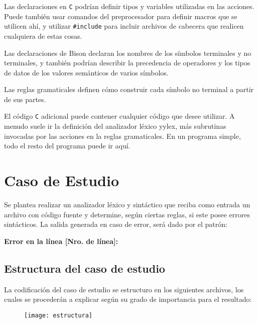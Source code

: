 \documentclass[spanish]{article}
\begin{document}
Las declaraciones en \texttt{C} podrían definir tipos y variables utilizadas en las acciones. Puede también usar comandos del preprocesador para definir macros que se utilicen ahí, y utilizar \texttt{\#include} para incluir archivos de cabecera que realicen cualquiera de estas cosas.

Las declaraciones de Bison declaran los nombres de los símbolos terminales y no terminales, y también podrían describir la precedencia de operadores y los tipos de datos de los valores semánticos de varios símbolos.

Las reglas gramaticales definen cómo construir cada símbolo no terminal a partir de sus partes.

El código \texttt{C} adicional puede contener cualquier código que desee utilizar. A menudo suele ir la definición del analizador léxico yylex, más subrutinas invocadas por las acciones en la reglas gramaticales. En un programa simple, todo el resto del programa puede ir aquí.

\section{Caso de Estudio}
Se plantea realizar un analizador léxico y sintáctico que reciba como entrada un archivo con código fuente y determine, según ciertas reglas, si este posee errores sintácticos. La salida generada en caso de error, será dado por el patrón:
\begin{center}
{\ttfamily \textbf{Error en la línea [Nro. de línea]:}} {}
\end{center}
\subsection{Estructura del caso de estudio}
La codificación del caso de estudio se estructuro en los siguientes archivos, los cuales se procederán a explicar según su grado de importancia para el resultado:
	\begin{figure}[h]
	\centering
	\texttt{[image: estructura]}
	\label{estructura}
	\end{figure}
	
\end{document}
